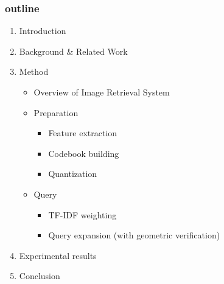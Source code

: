 \begin{frame}[fragile]
  \frametitle{outline}
  
  \begin{enumerate}
    \item Introduction
    \item Background \& Related Work
    \item Method
      \begin{itemize}
        \item Overview of Image Retrieval System
        \item Preparation
          \begin{itemize}
            \item Feature extraction \item Codebook building \item Quantization
          \end{itemize}
        \item Query
          \begin{itemize}
            \item TF-IDF weighting \item Query expansion (with geometric verification)
          \end{itemize}
      \end{itemize}
    \item Experimental results
    \item Conclusion
  \end{enumerate}

\end{frame}
